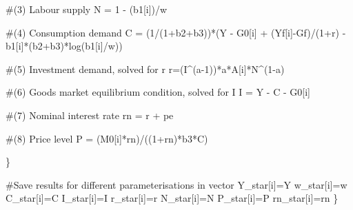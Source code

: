 \documentclass[
  letterpaper,
  DIV=11,
  numbers=noendperiod]{scrreprt}
\newenvironment{Shaded}{\begin{snugshade}}{\end{snugshade}}
\newcommand{\CommentTok}[1]{\textcolor[rgb]{0.37,0.37,0.37}{#1}}
\newcommand{\DecValTok}[1]{\textcolor[rgb]{0.68,0.00,0.00}{#1}}
\newcommand{\FunctionTok}[1]{\textcolor[rgb]{0.28,0.35,0.67}{#1}}
\newcommand{\NormalTok}[1]{\textcolor[rgb]{0.00,0.23,0.31}{#1}}
\newcommand{\OtherTok}[1]{\textcolor[rgb]{0.00,0.23,0.31}{#1}}
\newcommand{\SpecialCharTok}[1]{\textcolor[rgb]{0.37,0.37,0.37}{#1}}
\begin{document}
\begin{Shaded}
\begin{Highlighting}[]
  \CommentTok{\#(3) Labour supply}
\NormalTok{  N }\OtherTok{=} \DecValTok{1} \SpecialCharTok{{-}}\NormalTok{ (b1[i])}\SpecialCharTok{/}\NormalTok{w}
  
  \CommentTok{\#(4) Consumption demand}
\NormalTok{  C }\OtherTok{=}\NormalTok{ (}\DecValTok{1}\SpecialCharTok{/}\NormalTok{(}\DecValTok{1}\SpecialCharTok{+}\NormalTok{b2}\SpecialCharTok{+}\NormalTok{b3))}\SpecialCharTok{*}\NormalTok{(Y }\SpecialCharTok{{-}}\NormalTok{ G0[i] }\SpecialCharTok{+}\NormalTok{ (Yf[i]}\SpecialCharTok{{-}}\NormalTok{Gf)}\SpecialCharTok{/}\NormalTok{(}\DecValTok{1}\SpecialCharTok{+}\NormalTok{r) }\SpecialCharTok{{-}}\NormalTok{b1[i]}\SpecialCharTok{*}\NormalTok{(b2}\SpecialCharTok{+}\NormalTok{b3)}\SpecialCharTok{*}\FunctionTok{log}\NormalTok{(b1[i]}\SpecialCharTok{/}\NormalTok{w))}
   
  \CommentTok{\#(5) Investment demand, solved for r}
\NormalTok{  r}\OtherTok{=}\NormalTok{(I}\SpecialCharTok{\^{}}\NormalTok{(a}\DecValTok{{-}1}\NormalTok{))}\SpecialCharTok{*}\NormalTok{a}\SpecialCharTok{*}\NormalTok{A[i]}\SpecialCharTok{*}\NormalTok{N}\SpecialCharTok{\^{}}\NormalTok{(}\DecValTok{1}\SpecialCharTok{{-}}\NormalTok{a) }
   
  \CommentTok{\#(6) Goods market equilibrium condition, solved for I}
\NormalTok{  I }\OtherTok{=}\NormalTok{ Y }\SpecialCharTok{{-}}\NormalTok{ C }\SpecialCharTok{{-}}\NormalTok{ G0[i]}
  
  \CommentTok{\#(7) Nominal interest rate}
\NormalTok{  rn }\OtherTok{=}\NormalTok{ r }\SpecialCharTok{+}\NormalTok{ pe}
  
  \CommentTok{\#(8) Price level}
\NormalTok{  P }\OtherTok{=}\NormalTok{ (M0[i]}\SpecialCharTok{*}\NormalTok{rn)}\SpecialCharTok{/}\NormalTok{((}\DecValTok{1}\SpecialCharTok{+}\NormalTok{rn)}\SpecialCharTok{*}\NormalTok{b3}\SpecialCharTok{*}\NormalTok{C) }

\NormalTok{\}}
  
\CommentTok{\#Save results for different parameterisations in vector}
\NormalTok{Y\_star[i]}\OtherTok{=}\NormalTok{Y}
\NormalTok{w\_star[i]}\OtherTok{=}\NormalTok{w}
\NormalTok{C\_star[i]}\OtherTok{=}\NormalTok{C}
\NormalTok{I\_star[i]}\OtherTok{=}\NormalTok{I}
\NormalTok{r\_star[i]}\OtherTok{=}\NormalTok{r}
\NormalTok{N\_star[i]}\OtherTok{=}\NormalTok{N}
\NormalTok{P\_star[i]}\OtherTok{=}\NormalTok{P}
\NormalTok{rn\_star[i]}\OtherTok{=}\NormalTok{rn}
\NormalTok{\}}
\end{Highlighting}
\end{Shaded}
\end{document}
